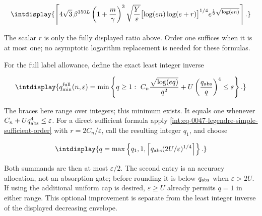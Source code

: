 \begingroup\renewcommand{\theHequation}{intdisplay.140}
\begin{equation}
\intdisplay{
\left\lceil4\sqrt3\,\beta^{150L}
\left(1+\frac m\gamma\right)^3\sqrt{\frac Y\varepsilon}
\bigl[\log(en)\log(e+r)\bigr]^{1/4}
e^{\frac12\sqrt{\log(en)}}\right\rceil.
}
\label{int:eq-0049-legendre-structural-sufficient-order}
\end{equation}
\endgroup


The scalar \(r\) is only the fully displayed ratio above. Order one suffices when it is at most one; no asymptotic logarithm replacement is needed for these formulas.



For the full label allowance, define the exact least integer inverse


\begingroup\renewcommand{\theHequation}{intdisplay.141}
\begin{equation}
\intdisplay{
q_{\min}^{\rm full}(n,\varepsilon)=
\min\left\{q\ge1:\
C_n\frac{\sqrt{\log(eq)}}{q^2}
+U\left(\frac{q_{\rm abs}}{q}\right)^4\le\varepsilon\right\}.
}
\label{int:eq-0050-legendre-full-inverse}
\end{equation}
\endgroup


The braces here range over integers; this minimum exists. It equals one whenever \(C_n+Uq_{\rm abs}^4\le\varepsilon\). For a direct sufficient formula apply \eqref{int:eq-0047-legendre-simple-sufficient-order} with \(r=2C_n/\varepsilon\), call the resulting integer \(q_1\), and choose


\begingroup\renewcommand{\theHequation}{intdisplay.142}
\begin{equation}
\intdisplay{
q=\max\left\{q_1,1,
\left\lceil q_{\rm abs}(2U/\varepsilon)^{1/4}\right\rceil\right\}.
}
\label{int:eq-0051-legendre-full-sufficient-order}
\end{equation}
\endgroup


Both summands are then at most \(\varepsilon/2\). The second entry is an accuracy allocation, not an absorption gate; before rounding it is below \(q_{\rm abs}\) when \(\varepsilon>2U\). If using the additional uniform cap is desired, \(\varepsilon\ge U\) already permits \(q=1\) in either range. This optional improvement is separate from the least integer inverse of the displayed decreasing envelope.


